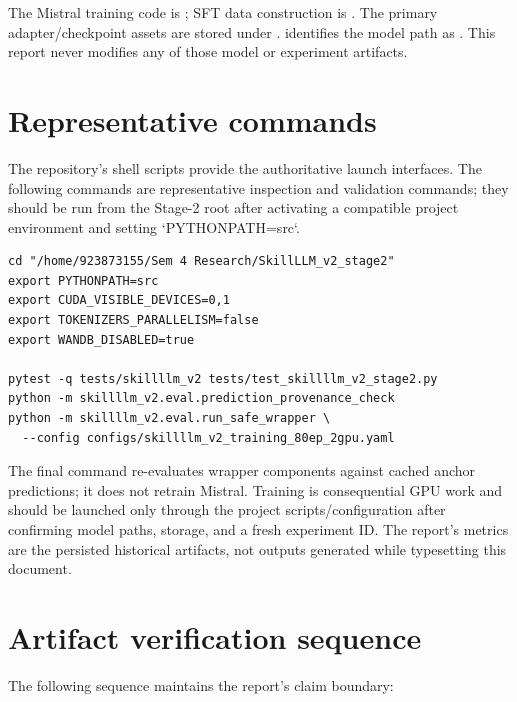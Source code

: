 The Mistral training code is ; SFT data construction is . The primary adapter/checkpoint assets are stored under .  identifies the model path as . This report never modifies any of those model or experiment artifacts.

\section{Representative commands}

The repository's shell scripts provide the authoritative launch interfaces. The following commands are representative inspection and validation commands; they should be run from the Stage-2 root after activating a compatible project environment and setting `PYTHONPATH=src`.

\begin{verbatim}
cd "/home/923873155/Sem 4 Research/SkillLLM_v2_stage2"
export PYTHONPATH=src
export CUDA_VISIBLE_DEVICES=0,1
export TOKENIZERS_PARALLELISM=false
export WANDB_DISABLED=true

pytest -q tests/skillllm_v2 tests/test_skillllm_v2_stage2.py
python -m skillllm_v2.eval.prediction_provenance_check
python -m skillllm_v2.eval.run_safe_wrapper \
  --config configs/skillllm_v2_training_80ep_2gpu.yaml
\end{verbatim}

The final command re-evaluates wrapper components against cached anchor predictions; it does not retrain Mistral. Training is consequential GPU work and should be launched only through the project scripts/configuration after confirming model paths, storage, and a fresh experiment ID. The report's metrics are the persisted historical artifacts, not outputs generated while typesetting this document.

\section{Artifact verification sequence}

The following sequence maintains the report's claim boundary:

